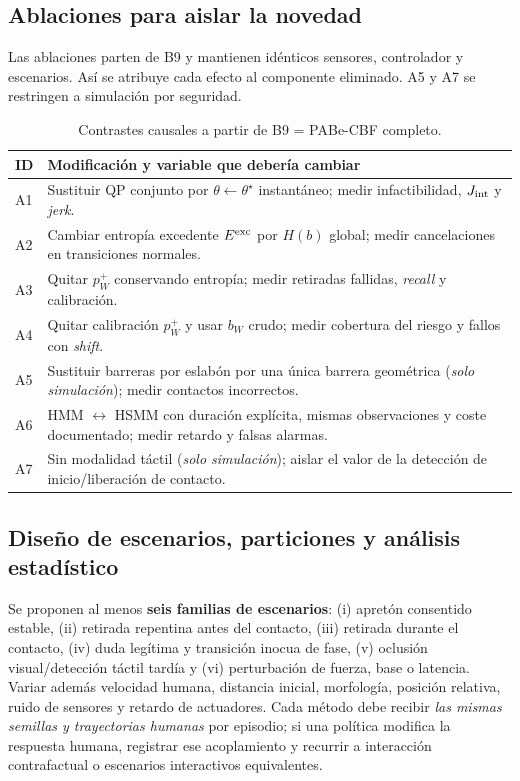 \documentclass[10pt,a4paper,twocolumn]{article}
\begin{document}
\subsection{Ablaciones para aislar la novedad}
Las ablaciones parten de B9 y mantienen idénticos sensores, controlador y escenarios. Así se atribuye cada efecto al componente eliminado. A5 y A7 se restringen a simulación por seguridad.
\begin{table}[!t]
\centering\footnotesize
\caption{Contrastes causales a partir de B9 = PABe-CBF completo.}
\vspace{2pt}
\begin{tabularx}{\textwidth}{@{}p{17mm}X@{}}
\toprule\textbf{ID} & \textbf{Modificación y variable que debería cambiar}\\\midrule
A1 & Sustituir QP conjunto por $\theta\leftarrow\theta^\star$ instantáneo; medir infactibilidad, $J_{\rm int}$ y \emph{jerk}.\\
A2 & Cambiar entropía excedente $E^{\rm exc}$ por $H(b)$ global; medir cancelaciones en transiciones normales.\\
A3 & Quitar $p_W^+$ conservando entropía; medir retiradas fallidas, \emph{recall} y calibración.\\
A4 & Quitar calibración $p_W^+$ y usar $b_W$ crudo; medir cobertura del riesgo y fallos con \emph{shift}.\\
A5 & Sustituir barreras por eslabón por una única barrera geométrica (\emph{solo simulación}); medir contactos incorrectos.\\
A6 & HMM $\leftrightarrow$ HSMM con duración explícita, mismas observaciones y coste documentado; medir retardo y falsas alarmas.\\
A7 & Sin modalidad táctil (\emph{solo simulación}); aislar el valor de la detección de inicio/liberación de contacto.\\
\bottomrule
\end{tabularx}
\end{table}

\subsection{Diseño de escenarios, particiones y análisis estadístico}
Se proponen al menos \textbf{seis familias de escenarios}: (i) apretón consentido estable, (ii) retirada repentina antes del contacto, (iii) retirada durante el contacto, (iv) duda legítima y transición inocua de fase, (v) oclusión visual/detección táctil tardía y (vi) perturbación de fuerza, base o latencia. Variar además velocidad humana, distancia inicial, morfología, posición relativa, ruido de sensores y retardo de actuadores. Cada método debe recibir \emph{las mismas semillas y trayectorias humanas} por episodio; si una política modifica la respuesta humana, registrar ese acoplamiento y recurrir a interacción contrafactual o escenarios interactivos equivalentes.
\end{document}
